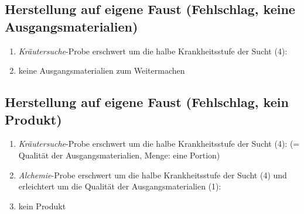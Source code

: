 \subsection{Herstellung auf eigene Faust (Fehlschlag, keine Ausgangsmaterialien)}
\begin{enumerate}
	\item \emph{Kräutersuche}-Probe erschwert um die halbe Krankheitsstufe der Sucht (4): 
	\item keine Ausgangsmaterialien zum Weitermachen
\end{enumerate}

\subsection{Herstellung auf eigene Faust (Fehlschlag, kein Produkt)}
\begin{enumerate}
	\item \emph{Kräutersuche}-Probe erschwert um die halbe Krankheitsstufe der Sucht (4):  (= Qualität der Ausgangsmaterialien, Menge: eine Portion)
	\item \emph{Alchemie}-Probe erschwert um die halbe Krankheitsstufe der Sucht (4) und erleichtert um die Qualität der Ausgangsmaterialien (1): 
	\item kein Produkt
\end{enumerate}

